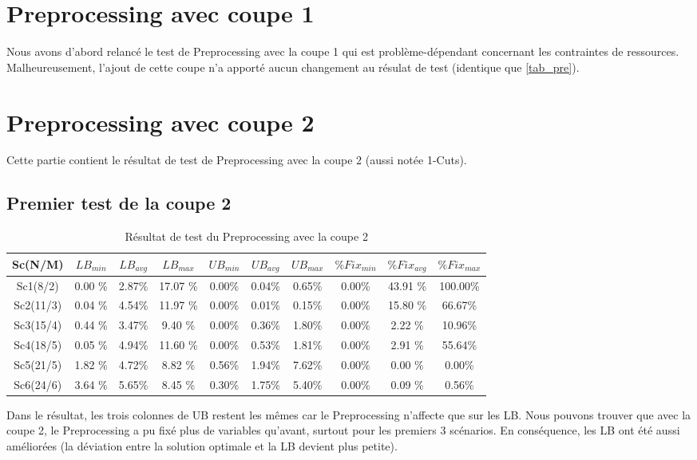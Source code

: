 \documentclass[twoside,fleqn]{EPURapport}
\begin{document}
\section{Preprocessing avec coupe 1}
Nous avons d'abord relancé le test de Preprocessing avec la coupe 1 qui est problème-dépendant concernant les contraintes de ressources. Malheureusement, l'ajout de cette coupe n'a apporté aucun changement au résulat de test (identique que \ref{tab_pre}).

\section{Preprocessing avec coupe 2}
Cette partie contient le résultat de test de Preprocessing avec la coupe 2 (aussi notée 1-Cuts).
\clearpage
\subsection{Premier test de la coupe 2}
\begin{table}[h]
    \centering
    \begin{tabular}{|c|c|c|c|c|c|c|c|c|c|}
    	\hline
Sc(N/M)	& $LB_{min}$ & $LB_{avg}$ & $LB_{max}$ & $UB_{min}$ & $UB_{avg}$ & $UB_{max}$ & $\%Fix_{min}$ & $\%Fix_{avg}$ & $\%Fix_{max}$\\ \hline
Sc1(8/2) & 0.00 \% &	2.87\%  &	17.07	\%  &0.00\% & 0.04\%  &0.65\%  &0.00\%  &43.91	\% &100.00\% \\ \hline
Sc2(11/3)& 0.04 \% & 	4.54\% & 	11.97	\% & 0.00\%&  0.01\% & 0.15\% & 0.00\%  &15.80	\% &66.67\%\\ \hline
Sc3(15/4)& 0.44 \% & 	3.47\% & 	9.40	\% & 0.00\%&  0.36\% & 1.80\% & 0.00\%  &2.22	\% &10.96\%\\ \hline
Sc4(18/5)& 0.05 \% & 	4.94\% & 	11.60	\% & 0.00\%&  0.53\% & 1.81\% & 0.00\%  &2.91	\% &55.64\%\\ \hline
Sc5(21/5)& 1.82 \% & 	4.72\% & 	8.82	\%  &0.56\% & 1.94\%  &7.62\%  &0.00\%  &0.00	\% &0.00\%\\ \hline
Sc6(24/6)& 3.64 \% & 	5.65\% & 	8.45	\%  &0.30\% & 1.75\%  &5.40\%  &0.00\%  &0.09	\% &0.56\%\\ \hline 
    \end{tabular}
    \label{tab_pre_2}
    \caption{Résultat de test du Preprocessing avec la coupe 2}
\end{table}
\bigskip

Dans le résultat, les trois colonnes de UB restent les mêmes car le Preprocessing n'affecte que sur les LB. Nous pouvons trouver que avec la coupe 2, le Preprocessing a pu fixé plus de variables qu'avant, surtout pour les premiers 3 scénarios. En conséquence, les LB ont été aussi améliorées (la déviation entre la solution optimale et la LB devient plus petite).
\end{document}
